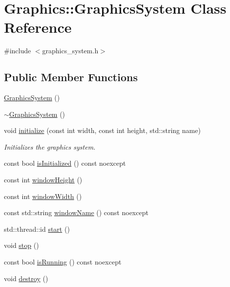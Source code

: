 \hypertarget{class_graphics_1_1_graphics_system}{}\section{Graphics\+:\+:Graphics\+System Class Reference}
\label{class_graphics_1_1_graphics_system}


{\ttfamily \#include $<$graphics\+\_\+system.\+h$>$}

\subsection*{Public Member Functions}
\begin{DoxyCompactItemize}
\item 
\hyperlink{class_graphics_1_1_graphics_system_a748459586ae5ea2aa8721dddb8660de6}{Graphics\+System} ()
\item 
\hyperlink{class_graphics_1_1_graphics_system_a6504df337bfae3a08abc8a63deb6df37}{$\sim$\+Graphics\+System} ()
\item 
void \hyperlink{class_graphics_1_1_graphics_system_aab302ea4f5ee819d582d4eba5c17787b}{initialize} (const int width, const int height, std\+::string name)
\begin{DoxyCompactList}\small\item\em Initializes the graphics system. \end{DoxyCompactList}\item 
const bool \hyperlink{class_graphics_1_1_graphics_system_a1bd027633e66df5a65f2df33952d1dbd}{is\+Initialized} () const noexcept
\item 
const int \hyperlink{class_graphics_1_1_graphics_system_a09710fc777ac4db1b44c63c2921d217f}{window\+Height} ()
\item 
const int \hyperlink{class_graphics_1_1_graphics_system_adab3606d554a85ca13aaaec29ceee68c}{window\+Width} ()
\item 
const std\+::string \hyperlink{class_graphics_1_1_graphics_system_a691efb4de942f8da79ecbcf626280724}{window\+Name} () const noexcept
\item 
std\+::thread\+::id \hyperlink{class_graphics_1_1_graphics_system_adf3edc07e52292d8251d2c18fc9e6d65}{start} ()
\item 
void \hyperlink{class_graphics_1_1_graphics_system_ae91bfded776e654aa28ea8c0185ecc8d}{stop} ()
\item 
const bool \hyperlink{class_graphics_1_1_graphics_system_a44c11ee970c78093a60cb2c3125a7764}{is\+Running} () const noexcept
\item 
void \hyperlink{class_graphics_1_1_graphics_system_a629d2fe80f761f4f4004ba74ad458e3f}{destroy} ()
\end{DoxyCompactItemize}
